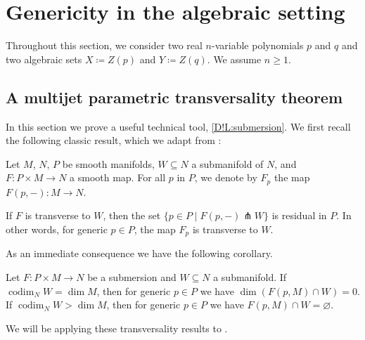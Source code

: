 \section{Genericity in the algebraic setting}
\label{D!S:Genericity-algebraic}

Throughout this section, we consider two real $n$-variable polynomials $p$ and $q$ and two algebraic sets $X \coloneq Z(p)$ and $Y \coloneq Z(q)$. We assume $n \geq 1$.

\subsection{A multijet parametric transversality theorem}\label{D!sec:multijet}

In this section we prove a useful technical tool, \cref{D!L:submersion}. We first recall the following classic result, which we adapt from \cite[Chapter 3, Theorem 2.7]{Hirsch1976}:

\begin{theorem}
\label{D!T:parametric-transversality}
  Let $M$, $N$, $P$ be smooth manifolds, $W \subseteq N$ a submanifold of $N$, and $F \colon P \times M \to N$ a smooth map. For all $p$ in $P$, we denote by $F_p$ the map $F(p, -) \colon M \to N$.

  If $F$ is transverse to $W$, then the set $\{p \in P \mid F(p, -) \pitchfork W\}$ is residual in $P$. In other words, for generic $p \in P$, the map $F_p$ is transverse to $W$.
\end{theorem}

As an immediate consequence we have the following corollary.

\begin{corollary}
\label{D!C:param-trans-cor}
  Let $F \colon P \times M \to N$ be a submersion and $W \subseteq N$ a submanifold. If $\operatorname{codim}_N W = \dim M$, then for generic $p \in P$ we have $\dim(F(p, M) \cap W) = 0$. If $\operatorname{codim}_N W > \dim M$, then for generic $p \in P$ we have $F(p, M) \cap W = \varnothing$.
\end{corollary}

We will be applying these transversality results to .

